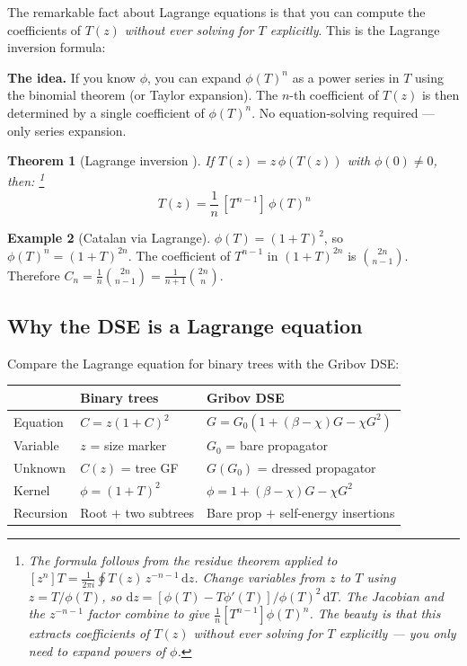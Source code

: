 \documentclass[11pt,a4paper]{article}
\newtheorem{theorem}{Theorem}[section]
\theoremstyle{definition}
\newtheorem{example}[theorem]{Example}
\newcommand{\dd}{\mathrm{d}}
\begin{document}
The remarkable fact about Lagrange equations is that you can compute the
coefficients of $T(z)$ \emph{without ever solving for $T$ explicitly}.
This is the Lagrange inversion formula:

\textbf{The idea.} If you know $\phi$, you can expand $\phi(T)^n$ as a
power series in $T$ using the binomial theorem (or Taylor expansion).
The $n$-th coefficient of $T(z)$ is then determined by a single coefficient
of $\phi(T)^n$. No equation-solving required --- only series expansion.

\begin{theorem}[Lagrange inversion {\cite[Thm.~A.2]{flajolet2009}}]
If $T(z) = z\,\phi(T(z))$ with $\phi(0) \neq 0$, then:%
\footnote{The formula follows from the residue theorem applied to
$[z^n]T = \frac{1}{2\pi i}\oint T(z)\,z^{-n-1}\,\dd z$. Change variables
from $z$ to $T$ using $z = T/\phi(T)$, so $\dd z = [\phi(T) - T\phi'(T)]/\phi(T)^2\,\dd T$.
The Jacobian and the $z^{-n-1}$ factor combine to give $\frac{1}{n}[T^{n-1}]\phi(T)^n$.
The beauty is that this extracts coefficients of $T(z)$ without ever solving
for $T$ explicitly --- you only need to expand powers of $\phi$.}
\begin{equation}
[z^n]\, T(z) = \frac{1}{n}\, [T^{n-1}]\, \phi(T)^n
\end{equation}
\end{theorem}

\begin{example}[Catalan via Lagrange]
$\phi(T) = (1+T)^2$, so $\phi(T)^n = (1+T)^{2n}$.
The coefficient of $T^{n-1}$ in $(1+T)^{2n}$ is $\binom{2n}{n-1}$.
Therefore $C_n = \frac{1}{n}\binom{2n}{n-1} = \frac{1}{n+1}\binom{2n}{n}$. \checkmark
\end{example}

\subsection{Why the DSE is a Lagrange equation}

Compare the Lagrange equation for binary trees with the Gribov DSE:

\begin{center}
\renewcommand{\arraystretch}{1.3}
\begin{tabular}{lll}
\toprule
& \textbf{Binary trees} & \textbf{Gribov DSE} \\
\midrule
Equation & $C = z(1 + C)^2$ & $G = G_0(1 + (\beta{-}\chi)G - \chi G^2)$ \\
Variable & $z$ = size marker & $G_0$ = bare propagator \\
Unknown & $C(z)$ = tree GF & $G(G_0)$ = dressed propagator \\
Kernel & $\phi = (1+T)^2$ & $\phi = 1 + (\beta{-}\chi)G - \chi G^2$ \\
Recursion & Root $+$ two subtrees & Bare prop $+$ self-energy insertions \\
\bottomrule
\end{tabular}
\end{center}
\end{document}
